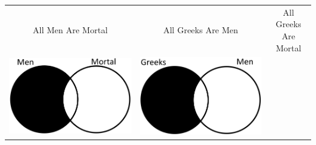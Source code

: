\documentclass[12pt,a4paper]{report}
\begin{document}
\begin{table}[htb]
  \centering
  \begin{tabular}{ c  c  c }
    All Men Are Mortal & All Greeks Are Men & All Greeks Are Mortal\\
    \begin{minipage}{.29\textwidth}
      \includegraphics[scale=0.25]{VennAllMenAreMortal}
    \end{minipage}
    &
    \begin{minipage}{.29\textwidth}
      \includegraphics[scale=0.25]{VennAllGreeksAreMen}
    \end{minipage}
    & 
    \begin{minipage}{.29\textwidth}

\end{minipage}
\end{tabular}
\end{table}
\end{document}
